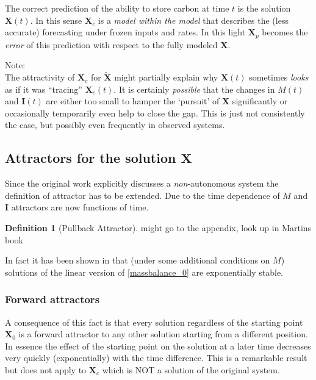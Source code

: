 \documentclass[journal abbreviation, manuscript]{copernicus}
\theoremstyle{definition}
\newtheorem{definition}{Definition}[section]
\newcommand{\X}{\mathbf{X}}
\newcommand{\I}{\mathbf{I}}
\begin{document}
The correct prediction of the ability to store carbon at time $t$ is the solution $\X(t)$. In this sense $\X_c$ is a \emph{model within the model} that describes the (less accurate) forecasting under frozen inputs and rates. In this light $\X_p$ becomes the \emph{error} of this prediction with respect to the fully modeled $\X$.

Note: \\
The attractivity of $\X_c$ for $\tilde{\X}$ might partially explain why $\X(t)$ sometimes \emph{looks} as if it was ``tracing'' $\X_c(t)$.
It is certainly \emph{possible} that the changes in $M(t)$ and $\I(t)$ are either too small to hamper the `pursuit' of $\X$ significantly or occasionally temporarily even help to close the gap.
This is just not consistently the case, but possibly even frequently in observed systems.

\subsection{Attractors for the solution $\X$}
Since the original work explicitly discusses a \emph{non}-autonomous system the definition of attractor has to be extended. Due to the time dependence of $M$ and $\I$ attractors are now functions of time.
\begin{definition}[Pullback Attractor]
{\color{red} might go to the appendix, look up in Martins book}

\end{definition}
In fact it has been shown in \citep{Rasmussen2016JMB} that (under some additional conditions on $M$) solutions of the linear version of  \eqref{massbalance_0} are exponentially stable. 
\subsubsection{Forward attractors}
A consequence of this fact is that every solution regardless of the starting point $\X_0$ is a forward attractor to any other solution starting from a different position. 
In essence the effect of the starting point on the solution at a later time decreases very quickly (exponentially) with the time difference. 
This is a remarkable result but does not apply to $\X_c$ which is NOT a solution of the original system. 
\end{document}
